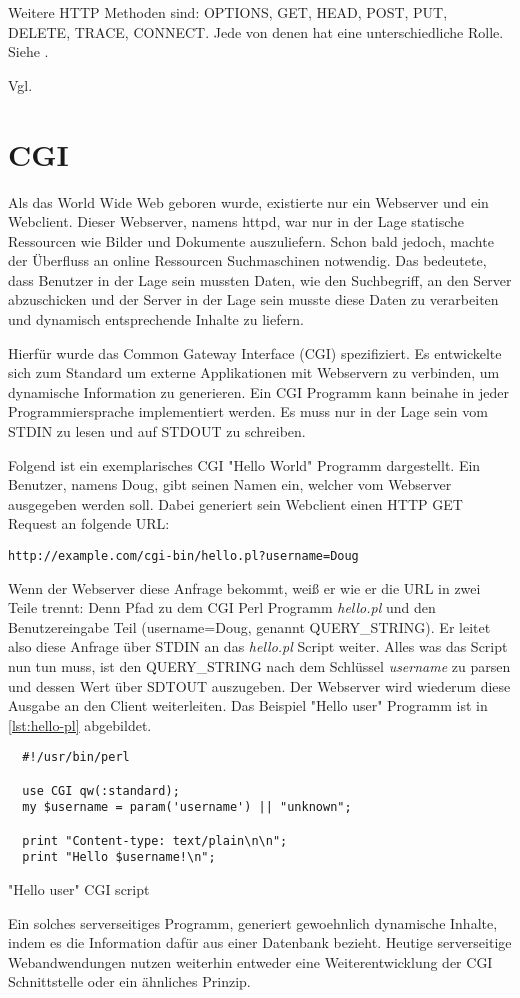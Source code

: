 Weitere HTTP Methoden sind: OPTIONS, GET, HEAD, POST, PUT, DELETE, TRACE, CONNECT. 
Jede von denen hat eine unterschiedliche Rolle. Siehe \citep[Kap. 4]{http_spec}. 

Vgl. \citep{dubost}

\section{CGI}

Als das World Wide Web geboren wurde, existierte nur ein Webserver und ein Webclient. Dieser Webserver, namens httpd, war nur in der Lage statische Ressourcen wie Bilder und Dokumente auszuliefern. Schon bald jedoch, machte der Überfluss an online Ressourcen Suchmaschinen notwendig. Das bedeutete, dass Benutzer in der Lage sein mussten Daten, wie den Suchbegriff, an den Server abzuschicken und der Server in der Lage sein musste diese Daten zu verarbeiten und dynamisch entsprechende Inhalte zu liefern.

Hierfür wurde das Common Gateway Interface (CGI) spezifiziert. Es entwickelte sich zum Standard um externe Applikationen mit Webservern zu verbinden, um dynamische Information zu generieren. Ein CGI Programm kann beinahe in jeder Programmiersprache implementiert werden. Es muss nur in der Lage sein vom STDIN zu lesen und auf STDOUT zu schreiben.  

Folgend ist ein exemplarisches CGI "Hello World" Programm dargestellt. Ein Benutzer, namens Doug, gibt seinen Namen ein, welcher vom Webserver ausgegeben werden soll. Dabei generiert sein Webclient einen HTTP GET Request an folgende URL: 


\begin{verbatim}
http://example.com/cgi-bin/hello.pl?username=Doug
\end{verbatim}

Wenn der Webserver diese Anfrage bekommt, weiß er wie er die URL in zwei Teile trennt: Denn Pfad zu dem CGI Perl Programm \emph{hello.pl} und den Benutzereingabe Teil (username=Doug, genannt QUERY\_STRING). Er leitet also diese Anfrage über STDIN an das \emph{hello.pl} Script weiter. Alles was das Script nun tun muss, ist den QUERY\_STRING nach dem Schlüssel 
\emph{username} zu parsen und dessen Wert über SDTOUT auszugeben. Der Webserver wird wiederum diese Ausgabe an den Client weiterleiten. Das Beispiel "Hello user" Programm ist in \ref{lst:hello-pl} abgebildet. 

\begin{listing}[H]
\begin{verbatim}
  #!/usr/bin/perl
  
  use CGI qw(:standard);
  my $username = param('username') || "unknown";
  
  print "Content-type: text/plain\n\n";
  print "Hello $username!\n";
\end{verbatim}
\caption{"Hello user" CGI script}
\label{lst:hello-pl}
\end{listing} 

Ein solches serverseitiges Programm, generiert gewoehnlich dynamische Inhalte, indem es die Information dafür aus einer Datenbank bezieht. Heutige serverseitige Webandwendungen nutzen weiterhin entweder eine Weiterentwicklung der CGI Schnittstelle oder ein ähnliches Prinzip.

